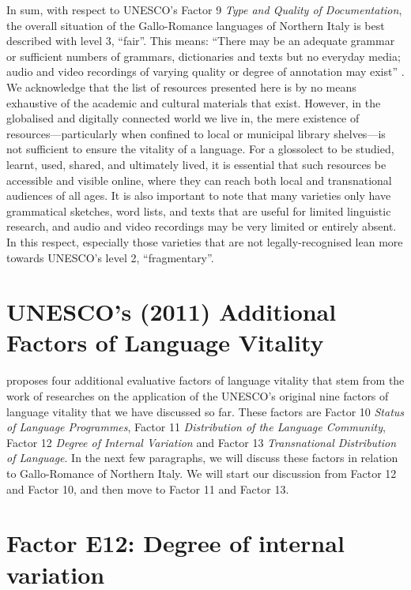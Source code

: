\documentclass[a4paper,11pt]{article}
\begin{document}
In sum, with respect to UNESCO's \citeyearpar{unesco2003} Factor 9 \textit{Type and Quality of Documentation}, the overall situation of the Gallo-Romance languages of Northern Italy is best described with level 3, ``fair''. This means: ``There may be an adequate grammar or sufficient numbers of grammars, dictionaries and texts but no everyday media; audio and video recordings of varying quality or degree of annotation may exist'' \citep[16]{unesco2003}. We acknowledge that the list of resources presented here is by no means exhaustive of the academic and cultural materials that exist. However, in the globalised and digitally connected world we live in, the mere existence of resources—particularly when confined to local or municipal library shelves—is not sufficient to ensure the vitality of a language. For a glossolect to be studied, learnt, used, shared, and ultimately lived, it is essential that such resources be accessible and visible online, where they can reach both local and transnational audiences of all ages.
It is also important to note that many varieties only have grammatical sketches, word lists, and texts that are useful for limited linguistic research, and audio and video recordings may be very limited or entirely absent. In this respect, especially those varieties that are not legally-recognised lean more towards UNESCO’s \citeyearpar{unesco2003} level 2, ``fragmentary''.

\section{UNESCO’s (2011) Additional Factors of Language Vitality }

\citet{unesco2011} proposes four additional evaluative factors of language vitality that stem from the work of researches on the application of the UNESCO’s \citeyearpar{unesco2003} original nine factors of language vitality that we have discussed so far. These factors are Factor 10 \textit{Status of Language Programmes}, Factor 11 \textit{Distribution of the Language Community}, Factor 12 \textit{Degree of Internal Variation} and Factor 13 \textit{Transnational Distribution of Language}. In the next few paragraphs, we will discuss these factors in relation to Gallo-Romance of Northern Italy. We will start our discussion from Factor 12 and Factor 10, and then move to Factor 11 and Factor 13. 

\section{Factor E12: Degree of internal variation}
\end{document}
